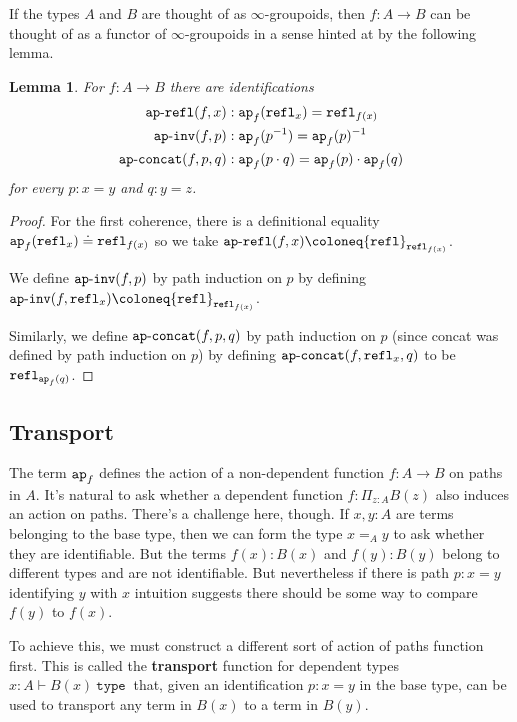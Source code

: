 \documentclass{amsart}
\theoremstyle{theorem}
\newtheorem*{lem}{Lemma}
\theoremstyle{definition}
\theoremstyle{remark}
\newcommand{\0}{\mathbbe{0}}
\newcommand{\1}{\mathbbe{1}}
\newcommand{\2}{\mathbbe{2}}
\newcommand{\3}{\mathbbe{3}}
\newcommand{\4}{\mathbbe{4}}
\newcommand{\univ}{{~\texttt{type}~}}
\newcommand{\term}[1]{{\textup{\texttt{#1}}}}
\newcommand{\refl}{\term{refl}}
\newcommand{\ap}{\term{ap}}
\newcommand{\apcoh}[1]{\term{ap}\text{-}\term{#1}}
\begin{document}
If the types $A$ and $B$ are thought of as $\infty$-groupoids, then $f \colon A \to B$ can be thought of as a functor of $\infty$-groupoids in a sense hinted at by the following lemma.

\begin{lem} For $f \colon A \to B$ there are identifications
\begin{align*}
\apcoh{refl}(f,x) &: \ap_f (\refl_x) = \refl_{f(x)} \\
\apcoh{inv}(f,p) &: \ap_f (p^{-1}) = \ap_f(p)^{-1} \\
\apcoh{concat}(f,p,q) &: \ap_f(p \cdot q) = \ap_f(p) \cdot \ap_f(q)
\end{align*}
for every $p : x= y$ and $q: y = z$.
\end{lem}
\begin{proof}
For the first coherence, there is a definitional equality $\ap_f (\refl_x) \doteq \refl_{f(x)}$ so we take $\apcoh{refl}(f,x) \coloneq \refl_{\refl_{f(x)}}$. 

We define $\apcoh{inv}(f,p)$ by path induction on $p$ by defining $\apcoh{inv}(f,\refl_x) \coloneq \refl_{\refl_{f(x)}}$.

Similarly, we define $\apcoh{concat}(f,p,q)$ by path induction on $p$ (since concat was defined by path induction on $p$) by defining $\apcoh{concat}(f,\refl_x,q)$ to be $\refl_{\ap_f(q)}$.
\end{proof}

\subsection*{Transport}

The term $\ap_f$ defines the action of a non-dependent function $f \colon A \to B$ on paths in $A$. It's natural to ask whether a dependent function $f : \Pi_{z:A}B(z)$ also induces an action on paths. There's a challenge here, though. If $x,y : A$ are terms belonging to the base type, then we can form the type $x=_A y$ to ask whether they are identifiable. But the terms $f(x) : B(x)$ and $f(y) : B(y)$  belong to different types and are not identifiable. But nevertheless if there is  path $p : x = y$ identifying $y$ with $x$ intuition suggests there should be some way to compare $f(y)$ to $f(x)$.

To achieve this, we must construct a different sort of action of paths function first. This is called the  \textbf{transport} function for dependent types $x :A \vdash B(x) \univ$ that, given an identification $p : x = y$ in the base type, can be used to transport any term in $B(x)$ to a term in $B(y)$.
\end{document}
